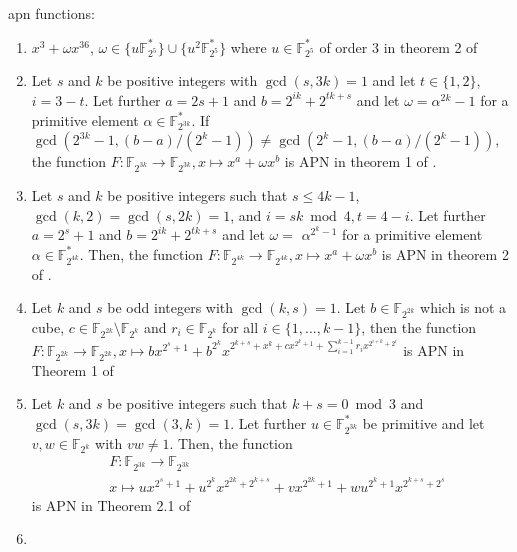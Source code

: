 \documentclass[12pt,a4paper]{ctexbook}
\newcommand{\0}{\textbf{0}}
\newcommand{\1}{\textbf{1}}
\newcommand{\F}{\mathbb{F}}
\begin{document}
apn functions:
\begin{enumerate}
    \item $ x^3+\omega x^{36} $, $ \omega\in \{u\F_{2^5}^*\}\cup\{u^2\F_{2^5}^*\} $ where $ u\in\F_{2^5}^* $ of order $ 3 $ in theorem 2 of \cite{edel2006newapn}
    \item Let $s$ and $k$ be positive integers with $\gcd(s, 3k) = 1$ and let $t \in\{1, 2\}$, $i = 3 − t$. Let further $a = 2s + 1$ and $b = 2^{ik} + 2^{tk+s}$ and let $\omega = \alpha^{2k}−1$ for a primitive element $\alpha \in\F_{2^{3k}}^* $. If $\gcd(2^{3k}−1, (b−a)/(2^k−1)) \ne \gcd(2^k−1, (b−a)/(2^k−1))$,
    the function $F : \F_{2^{3k}}\rightarrow \F_{2^{3k}}, x \mapsto x^a + \omega x^b$ is APN in theorem 1 of 
    \cite{Budaghyan2008twobinomialapn}.
    \item Let $s$ and $k$ be positive integers such that $s \leq 4 k-1$, $\gcd(k, 2)=\gcd(s, 2 k)=1$, and $i=s k \bmod 4, t=4-i$. Let further $a=2^{s}+1$ and $b=2^{i k}+2^{t k+s}$ and let $\omega=$ $\alpha^{2^{k}-1}$ for a primitive element $\alpha \in \mathbb{F}_{2^{4 k}}^{*}$. Then, the function $F: \mathbb{F}_{2^{4 k}} \rightarrow \mathbb{F}_{2^{4 k}}, x \mapsto x^{a}+\omega x^{b}$ is APN in theorem 2 of 
    \cite{Budaghyan2008twobinomialapn}.
    \item Let $k$ and $s$ be odd integers with $\gcd(k, s) = 1$. Let $ b\in\F_{2^{2k}} $ which is not a cube, 
    $ c\in\F_{2^{2k}}\setminus\F_{2^k} $ and $ r_i\in\F_{2^k} $ for all $ i\in\{1,...,k-1\} $, then the function
    $ F:\F_{2^{2k}}\rightarrow\F_{2^{2k}},x\mapsto bx^{2^s+1}+b^{2^k}x^{2^{k+s}+x^k+cx^{2^k+1}+\sum_{i=1}^{k-1}r_ix^{2^{i+k}+2^i}} $ is APN in Theorem 1 of \cite{Bracken2008apn}
    \item Let $k$ and $s$ be positive integers such that $k+s=0 \bmod 3$ and $\gcd(s, 3 k)=\gcd(3, k)=1$. Let further $u \in \mathbb{F}_{2^{3 k}}^{*}$ be primitive and let $v, w \in \mathbb{F}_{2^{k}}$ with $v w \neq 1$. Then, the function
    $$
    \begin{aligned}
    &F: \mathbb{F}_{2^{3 k}} \rightarrow \mathbb{F}_{2^{3 k}} \\
    &x \mapsto u x^{2^{s}+1}+u^{2^{k}} x^{2^{2 k}+2^{k+s}}+v x^{2^{2 k}+1}+w u^{2^{k}+1} x^{2^{k+s}+2^{s}}
    \end{aligned}
    $$
    is APN in Theorem 2.1 of \cite{bracken2011afewapn}
    \item 
\end{enumerate}






\end{document}
